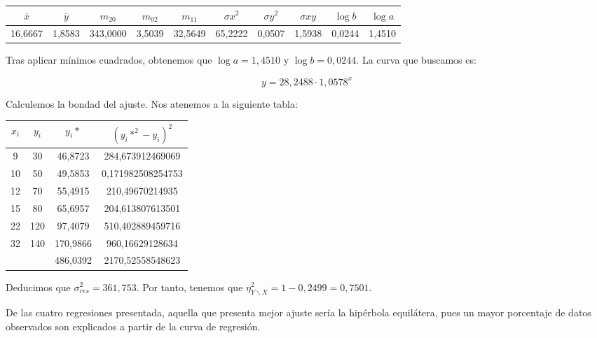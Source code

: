 \vspace{1em}

\tiny
\begin{tabular}{|c|c|c|c|c|c|c|c|c|c|}
	\hline
	$\overline{x}$ & $\overline{y}$ & $m_{20}$ & $m_{02}$ & $m_{11}$ & $\sigma{x}^2$ & $\sigma{y}^2$ & $\sigma{xy}$ & $\log{b}$ & $\log{a}$  \\ \hline
16,6667 & 1,8583 & 343,0000 & 3,5039 & 32,5649 & 65,2222 & 0,0507 & 1,5938 & 0,0244 & 1,4510 \\ \hline
\end{tabular}
\normalsize

\vspace{1em}

Tras aplicar mínimos cuadrados, obtenemos que $\log{a} = 1,4510$ y $\log{b}=0,0244$. La curva que buscamos es:

$$y=28,2488\cdot1,0578^{x}$$

Calculemos la bondad del ajuste. Nos atenemos a la siguiente tabla:

\begin{center}
	\begin{tabular}{|c|c|c|c|}
	\hline
	$x_i$ & $y_i$ & $y_i*$ & $(y_i*^2-y_i)^2$ \\ \hline
	9 & 30 & 46,8723 & 284,673912469069 \\ 
	10 & 50 & 49,5853 & 0,171982508254753 \\ 
	12 & 70 & 55,4915 & 210,49670214935 \\ 
	15 & 80 & 65,6957 & 204,613807613501 \\ 
	22 & 120 & 97,4079 & 510,402889459716 \\ 
	32 & 140 & 170,9866 & 960,16629128634 \\ \hline
	\multicolumn{1}{|l|}{} & \multicolumn{1}{l|}{} & 486,0392 & 2170,52558548623 \\ \hline
\end{tabular}
\end{center}

Deducimos que $\sigma_{res}^2 = 361,753$. Por tanto, tenemos que $\eta_{Y\backslash X}^2 = 1 - 0,2499 = 0,7501$.

\subproblem

De las cuatro regresiones presentada, aquella que presenta mejor ajuste sería la hipérbola equilátera, pues un mayor porcentaje de datos observados son explicados a partir de la curva de regresión.